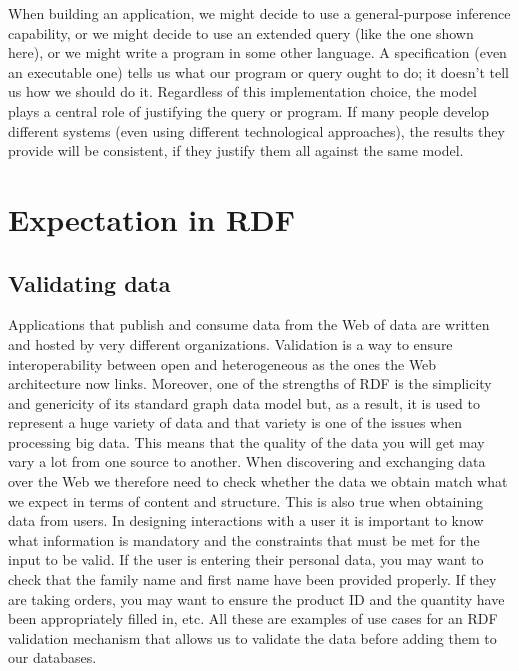 When building an application, we might decide to use a general-purpose
inference capability, or we might decide to use an extended query (like
the one shown here), or we might write a program in some other language.
A specification (even an executable one) tells us what our program or
query ought to do; it doesn't tell us how we should do it. Regardless of
this implementation choice, the model plays a central role of justifying
the query or program. If many people develop different systems (even
using different technological approaches), the results they provide will
be consistent, if they justify them all against the same model.


\section{Expectation in RDF}





\hypertarget{validating-data}{%
\subsection{Validating data}\label{validating-data}}

Applications that publish and consume data from the Web of data are
written and hosted by very different organizations. Validation is a way
to ensure interoperability between open and heterogeneous as the ones
the Web architecture now links. Moreover, one of the strengths of RDF is
the simplicity and genericity of its standard graph data model but, as a
result, it is used to represent a huge variety of data and that variety
is one of the issues when processing big data. This means that the
quality of the data you will get may vary a lot from one source to
another. When discovering and exchanging data over the Web we therefore
need to check whether the data we obtain match what we expect in terms
of content and structure. This is also true when obtaining data from
users. In designing interactions with a user it is important to know
what information is mandatory and the constraints that must be met for
the input to be valid. If the user is entering their personal data, you
may want to check that the family name and first name have been provided
properly. If they are taking orders, you may want to ensure the product
ID and the quantity have been appropriately filled in, etc. All these
are examples of use cases for an RDF validation mechanism that allows us
to validate the data before adding them to our databases.

